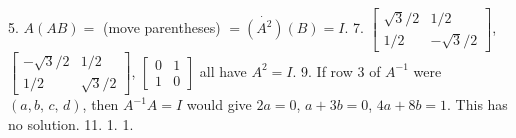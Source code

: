 5. \(A(AB)=\) (move parentheses) \(=\dot{(A^{2})}(B)=I\).
7. \(\begin{bmatrix}\sqrt{3}/2&1/2\\ 1/2&-\sqrt{3}/2\end{bmatrix}\), \(\begin{bmatrix}-\sqrt{3}/2&1/2\\ 1/2&\sqrt{3}/2\end{bmatrix}\), \(\begin{bmatrix}0&1\\ 1&0\end{bmatrix}\) all have \(A^{2}=I\).
9. If row 3 of \(A^{-1}\) were \((a,b,\,c,\,d)\), then \(A^{-1}A=I\) would give \(2a=0\), \(a+3b=0\), \(4a+8b=1\). This has no solution.
11. 1. 1.

 